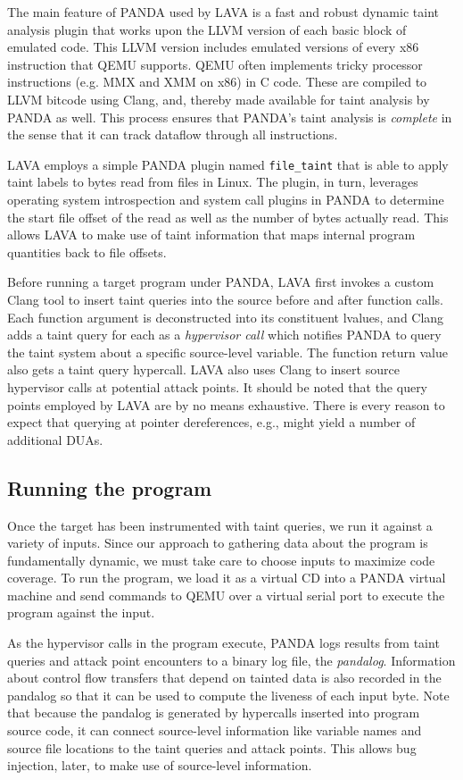 The main feature of PANDA used by LAVA is a fast and robust dynamic taint analysis plugin that works upon the LLVM version of each 
basic block of emulated code.
This LLVM version includes emulated versions of every x86 instruction that QEMU supports.
QEMU often implements tricky processor instructions (e.g. MMX and XMM on x86) in C code.
These are compiled to LLVM bitcode using Clang, and, thereby made available for taint analysis by PANDA as well.
This process ensures that PANDA's taint analysis is \emph{complete} in the sense that it can track dataflow through all instructions.

LAVA employs a simple PANDA plugin named \verb+file_taint+ that is able to apply taint labels to bytes read from files in Linux.
The plugin, in turn, leverages operating system introspection and system call plugins in PANDA to determine the start file offset of the read as well as the number of bytes actually read.
This allows LAVA to make use of taint information that maps internal program quantities back to file offsets.

Before running a target program under PANDA, LAVA first invokes a custom Clang tool to insert taint queries into the source before and after function calls.
Each function argument is deconstructed into its constituent lvalues, and Clang adds a taint query for each as a \emph{hypervisor call} which notifies PANDA to query the taint system about a specific source-level variable.
The function return value also gets a taint query hypercall.
LAVA also uses Clang to insert source hypervisor calls at potential attack points.
It should be noted that the query points employed by LAVA are by no means exhaustive.
There is every reason to expect that querying at pointer dereferences, e.g., might yield a number of additional DUAs.


\subsection{Running the program}
Once the target has been instrumented with taint queries, we run it against a variety of inputs.
Since our approach to gathering data about the program is fundamentally dynamic, we must take care to choose inputs to maximize code coverage.
To run the program, we load it as a virtual CD into a PANDA virtual machine and send commands to QEMU over a virtual serial port to execute the program against the input.

As the hypervisor calls in the program execute, PANDA logs results from taint queries and attack point encounters to a binary log file, the \emph{pandalog}.
Information about control flow transfers that depend on tainted data is also recorded in the pandalog so that it can be used to compute the liveness of each input byte.
Note that because the pandalog is generated by hypercalls inserted into program source code, it can connect source-level information like variable names and source file locations to the taint queries and attack points.
This allows bug injection, later, to make use of source-level information. 


